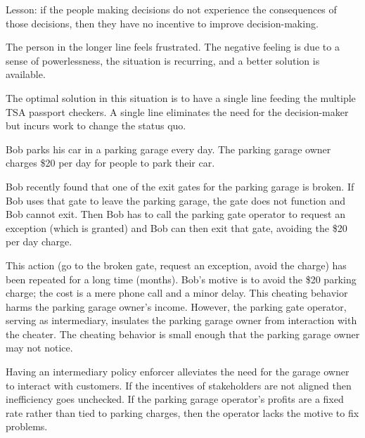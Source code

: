 Lesson: if the people making decisions do not experience the consequences of those decisions, then they have no incentive to improve decision-making.

The person in the longer line feels frustrated. The negative feeling is due to a sense of powerlessness, the situation is recurring, and a better solution is available.

The optimal solution in this situation is to have a single line feeding the multiple TSA passport checkers. A single line eliminates the need for the decision-maker but incurs work to change the status quo.



\begin{mdframed}[frametitle={Parking Garage},frametitlerule=true,frametitlealignment=\centering]
Bob parks his car in a parking garage every day. 
The parking garage owner charges \$20 per day for people to park their car.

Bob recently found that one of the exit gates for the parking garage is broken. If Bob uses that gate to leave the parking garage, the gate does not function and Bob cannot exit. Then Bob has to call the parking gate operator to request an exception (which is granted) and Bob can then exit that gate, avoiding the \$20 per day charge.

This action (go to the broken gate, request an exception, avoid the charge) has been repeated for a long time (months). Bob's motive is to avoid the \$20 parking charge; the cost is a mere phone call and a minor delay. This cheating behavior harms the parking garage owner's income. However, the parking gate operator, serving as intermediary, insulates the parking garage owner from interaction with the cheater. The cheating behavior is small enough that the parking garage owner may not notice.
\end{mdframed}

Having an intermediary policy enforcer alleviates the need for the garage owner to interact with customers. If the incentives of stakeholders are not aligned then inefficiency goes unchecked. If the parking garage operator's profits are a fixed rate rather than tied to parking charges, then the operator lacks the motive to fix problems. 